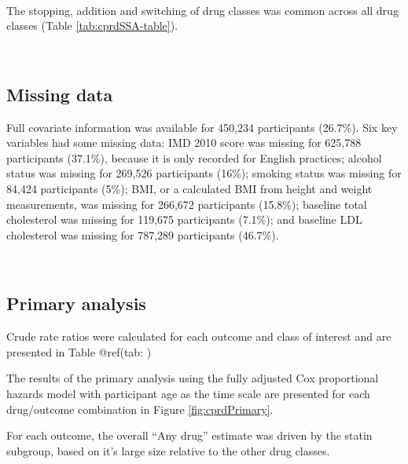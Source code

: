 \documentclass[a4paper, twoside]{templates/ociamthesis}
\begin{document}
~

The stopping, addition and switching of drug classes was common across all drug classes (Table \ref{tab:cprdSSA-table}).

~

\hypertarget{missing-data-1}{%
\subsection{Missing data}\label{missing-data-1}}

Full covariate information was available for 450,234 participants (26.7\%). Six key variables had some missing data: IMD 2010 score was missing for 625,788 participants (37.1\%), because it is only recorded for English practices; alcohol status was missing for 269,526 participants (16\%); smoking status was missing for 84,424 participants (5\%); BMI, or a calculated BMI from height and weight measurements, was missing for 266,672 participants (15.8\%); baseline total cholesterol was missing for 119,675 participants (7.1\%); and baseline LDL cholesterol was missing for 787,289 participants (46.7\%).

~

\hypertarget{primary-analysis}{%
\subsection{Primary analysis}\label{primary-analysis}}

Crude rate ratios were calculated for each outcome and class of interest and are presented in Table @ref(tab: )

The results of the primary analysis using the fully adjusted Cox proportional hazards model with participant age as the time scale are presented for each drug/outcome combination in Figure \ref{fig:cprdPrimary}.

For each outcome, the overall ``Any drug'' estimate was driven by the statin subgroup, based on it's large size relative to the other drug classes.

~
\end{document}
